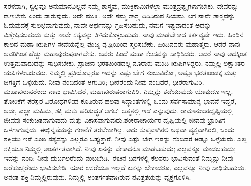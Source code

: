 ಸರಳವಾಗಿ, ಸ್ವಲ್ಪವೂ ಅನುಮಾನವಿಲ್ಲದೆ ನಮ್ಮ ಶಾಸ್ತ್ರವು, ಮುಕ್ತಿಕಾಮಿಗಳೆಲ್ಲಾ ಮಂತ್ರದ್ರಷ್ಟೃಗಳಾಗಬೇಕು, ದೇವರನ್ನು ಕಾಣಬೇಕು ಎಂದು ಸಾರುವುದು. ಅದೇ ಮುಕ್ತಿ. ಅದೇ ನಮ್ಮ ಶಾಸ್ತ್ರ ವಿಧಿಸಿರುವ ನಿಯಮ. ಆಗ ನಾವೇ ಶಾಸ್ತ್ರವನ್ನು ಓದುವುದಕ್ಕೆ ಸುಲಭವಾಗುವುದು, ನಾವೇ ಅರ್ಥವನ್ನು ಗ್ರಹಿಸಬಹುದು, ನಮಗೆ ಇಷ್ಟವಾದಂತೆ ಅದನ್ನು ವಿಶ್ಲೇಷಿಸಬಹುದು ಮತ್ತು ನಾವೇ ಸತ್ಯವನ್ನು ತಿಳಿದುಕೊಳ್ಳಬಹುದು. ನಾವು ಮಾಡಬೇಕಾದ ಕರ್ತವ್ಯವೇ ಇದು. ಹಿಂದಿನ ಕಾಲದ ಮಹಾ ಋಷಿಗಳ ಸೇವೆಯನ್ನೆಲ್ಲ ಪೂಜ್ಯ ದೃಷ್ಟಿಯಿಂದ ಸ್ಮರಿಸಬೇಕು. ಹಿಂದಿನವರು ಮಹಾತ್ಮರು. ಆದರೆ ನಾವು ಅವರಿಗಿಂತ ಹೆಚ್ಚು ಮಹಾಪುರುಷರಾಗಬೇಕು. ಅವರು ಹಿಂದೆ ಮಹಾ ಕೆಲಸವನ್ನು ಸಾಧಿಸಿದರು. ಆದರೆ ನಾವು ಅದಕ್ಕಿಂತ ಉತ್ತಮವಾದುದನ್ನು ಸಾಧಿಸಬೇಕು. ಪ್ರಾಚೀನ ಭರತಖಂಡದಲ್ಲಿ ನೂರಾರು ಮಂದಿ ಋಷಿಗಳಿದ್ದರು. ನಮ್ಮಲ್ಲಿ ಲಕ್ಷಾಂತರ ಋಷಿಗಳು\break ಬರುವರು. ನಿಮ್ಮಲ್ಲಿ ಪ್ರತಿಯೊಬ್ಬರೂ ಇದನ್ನು ಎಷ್ಟು ಬೇಗ ನಂಬುವಿರೋ, ಅಷ್ಟೂ ಭರತಖಂಡಕ್ಕೆ ಮತ್ತು ಜಗತ್ತಿಗೆ ಒಳ್ಳೆಯದು. ನೀವು ನಂಬಿದಂತೆ ಆಗುವಿರಿ; ಧೀರರೆಂದು ನೀವು ನಂಬಿದರೆ, ಧೀರರಾಗುವಿರಿ. ಮಹಾಪುರುಷರೆಂದು ನಾವು ಭಾವಿಸಿದರೆ, ಮಹಾಪುರುಷರಾಗುವಿರಿ. ನಿಮ್ಮನ್ನು ತಡೆಯುವುದು ಯಾವುದೂ ಇಲ್ಲ. ತೋರಿಕೆಗೆ ಪರಸ್ಪರ ವಿರೋಧಗಳಿಂದ ಕೂಡಿರುವ ಹಲವು ಸಿದ್ಧಾಂತಗಳಲ್ಲಿ ಒಂದು ಸರ್ವಸಾಮಾನ್ಯ ಭಾವನೆ ಇದ್ದರೆ, ಅದೇ, ಎಲ್ಲಾ ಮಹಿಮೆ, ಶಕ್ತಿ ಮತ್ತು ಪರಿಶುದ್ಧತೆ ಆಗಲೇ ಆತ್ಮನಲ್ಲಿ ಇದೆ ಎನ್ನುವುದು. ರಾಮಾನುಜರ\break ದೃಷ್ಟಿಯಲ್ಲಿ ಜೀವವು ಸಂಕುಚಿತವಾಗುವುದು ಮತ್ತು ವಿಕಾಸವಾಗುವುದು.\break ಶಂಕರಾಚಾರ್ಯರ ದೃಷ್ಟಿಯಲ್ಲಿ ಜೀವವು ಭ್ರಾಂತಿಗೆ ಒಳಗಾಗುವುದು. ಈ\break ಭಿನ್ನತೆಯನ್ನು ಗಣನೆಗೆ ತರಬೇಕಾಗಿಲ್ಲ. ಅದು ಸುಪ್ತವಾಗಿರಲಿ ಅಥವಾ ವ್ಯಕ್ತವಾಗಿರಲಿ, ಒಂದು ಶಕ್ತಿಯು ಇದೆ ಎಂಬ ಸತ್ಯವನ್ನು ಎಲ್ಲರೂ ಒಪ್ಪುತ್ತಾರೆ. ನೀವು ಎಷ್ಟು ಬೇಗ ಇದನ್ನು ನಂಬಿದರೆ ಅಷ್ಟೂ ಒಳ್ಳೆಯದು. ಎಲ್ಲ ಶಕ್ತಿಯೂ ನಿಮ್ಮಲ್ಲಿ ಅಂತರ್ಗತವಾಗಿದೆ. ನೀವು ಏನನ್ನು ಬೇಕಾದರೂ ಮಾಡಬಹುದು; ಎಲ್ಲವನ್ನೂ ಮಾಡಬಹುದು; ಇದನ್ನು ನಂಬಿ; ನೀವು ದುರ್ಬಲರೆಂದು ನಂಬಬೇಡಿ. ಈಚಿನ ದಿನಗಳಲ್ಲಿ ಕೆಲವರು ಭಾವಿಸುವಂತೆ ನಿಮ್ಮನ್ನು ನೀವು ಅರೆಹುಚ್ಚರೆಂದು ಭಾವಿಸಬೇಡಿ. ಯಾರ ಆಸರೆಯೂ ಇಲ್ಲದೆ ಏನನ್ನು ಬೇಕಾದರೂ, ಎಲ್ಲವನ್ನೂ ನೀವು ಸಾಧಿಸಬಹುದು. ಅನಂತ ಶಕ್ತಿ ನಿಮ್ಮಲ್ಲಿರುವುದು. ನಿಮ್ಮಲ್ಲಿ ಅಂತರ್ಗತವಾಗಿರುವ ಪವಿತ್ರತೆಯನ್ನು ವ್ಯಕ್ತಗೊಳಿಸಿ.

